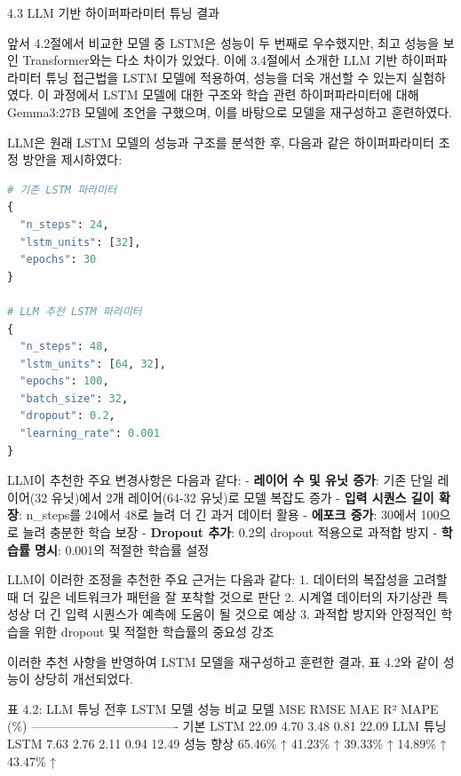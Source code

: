 \documentclass[12pt,ko,a4,]{report}
\begin{document}
4.3 LLM 기반 하이퍼파라미터 튜닝 결과

앞서 4.2절에서 비교한 모델 중 LSTM은 성능이 두 번째로 우수했지만, 최고
성능을 보인 Transformer와는 다소 차이가 있었다. 이에 3.4절에서 소개한
LLM 기반 하이퍼파라미터 튜닝 접근법을 LSTM 모델에 적용하여, 성능을 더욱
개선할 수 있는지 실험하였다. 이 과정에서 LSTM 모델에 대한 구조와 학습
관련 하이퍼파라미터에 대해 Gemma3:27B 모델에 조언을 구했으며, 이를
바탕으로 모델을 재구성하고 훈련하였다.

LLM은 원래 LSTM 모델의 성능과 구조를 분석한 후, 다음과 같은
하이퍼파라미터 조정 방안을 제시하였다:

\begin{lstlisting}[language=Python]
# 기존 LSTM 파라미터
{
  "n_steps": 24,
  "lstm_units": [32],
  "epochs": 30
}

# LLM 추천 LSTM 파라미터
{
  "n_steps": 48,
  "lstm_units": [64, 32],
  "epochs": 100,
  "batch_size": 32,
  "dropout": 0.2,
  "learning_rate": 0.001
}
\end{lstlisting}

LLM이 추천한 주요 변경사항은 다음과 같다: - \textbf{레이어 수 및 유닛
증가}: 기존 단일 레이어(32 유닛)에서 2개 레이어(64-32 유닛)로 모델
복잡도 증가 - \textbf{입력 시퀀스 길이 확장}: n\_steps를 24에서 48로
늘려 더 긴 과거 데이터 활용 - \textbf{에포크 증가}: 30에서 100으로 늘려
충분한 학습 보장 - \textbf{Dropout 추가}: 0.2의 dropout 적용으로 과적합
방지 - \textbf{학습률 명시}: 0.001의 적절한 학습률 설정

LLM이 이러한 조정을 추천한 주요 근거는 다음과 같다: 1. 데이터의 복잡성을
고려할 때 더 깊은 네트워크가 패턴을 잘 포착할 것으로 판단 2. 시계열
데이터의 자기상관 특성상 더 긴 입력 시퀀스가 예측에 도움이 될 것으로
예상 3. 과적합 방지와 안정적인 학습을 위한 dropout 및 적절한 학습률의
중요성 강조

이러한 추천 사항을 반영하여 LSTM 모델을 재구성하고 훈련한 결과, 표 4.2와
같이 성능이 상당히 개선되었다.

표 4.2: LLM 튜닝 전후 LSTM 모델 성능 비교 \textbar{} 모델 \textbar{} MSE
\textbar{} RMSE \textbar{} MAE \textbar{} R² \textbar{} MAPE (\%)
\textbar{}
\textbar------\textbar-----\textbar------\textbar-----\textbar-----\textbar----------\textbar{}
\textbar{} 기본 LSTM \textbar{} 22.09 \textbar{} 4.70 \textbar{} 3.48
\textbar{} 0.81 \textbar{} 22.09 \textbar{} \textbar{} LLM 튜닝 LSTM
\textbar{} 7.63 \textbar{} 2.76 \textbar{} 2.11 \textbar{} 0.94
\textbar{} 12.49 \textbar{} \textbar{} 성능 향상 \textbar{} 65.46\% ↑
\textbar{} 41.23\% ↑ \textbar{} 39.33\% ↑ \textbar{} 14.89\% ↑
\textbar{} 43.47\% ↑ \textbar{}
\end{document}
